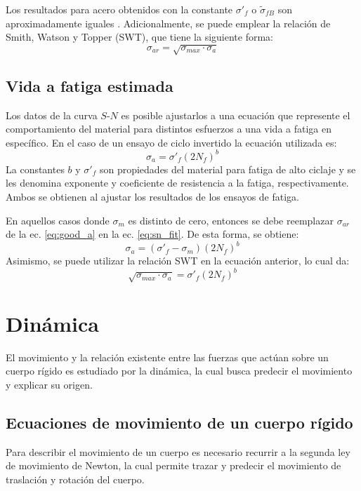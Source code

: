 Los resultados para acero obtenidos con la constante $\sigma'_f$ o $\tilde{\sigma}_{fB}$ son aproximadamente iguales \cite{dowling2013mechanical}. Adicionalmente, se puede emplear la relación de Smith, Watson y Topper (SWT), que tiene la siguiente forma:
\begin{equation} \label{eq:swt}
	\sigma_{ar} = \sqrt{\sigma_{max} \cdot \sigma_a}
\end{equation}

\subsection{Vida a fatiga estimada}
Los datos de la curva $S$-$N$ es posible ajustarlos a una ecuación que represente el comportamiento del material para distintos esfuerzos a una vida a fatiga en específico. En el caso de un ensayo de ciclo invertido la ecuación utilizada es:
\begin{equation} \label{eq:sn_fit}
	\sigma_a = \sigma'_f (2N_f)^b
\end{equation}
La constantes $b$ y $\sigma'_f$ son propiedades del material para fatiga de alto ciclaje y se les denomina exponente y coeficiente de resistencia a la fatiga, respectivamente. Ambos se obtienen al ajustar los resultados de los ensayos de fatiga. 

En aquellos casos donde $\sigma_m$ es distinto de cero, entonces se debe reemplazar $\sigma_{ar}$ de la ec. \ref{eq:good_a} en la ec. \ref{eq:sn_fit}. De esta forma, se obtiene:
\begin{equation}
	\sigma_a = (\sigma'_f - \sigma_m)(2N_f)^b
\end{equation}
Asimismo, se puede utilizar la relación SWT en la ecuación anterior, lo cual da:
\begin{equation} \label{eq:sn_swt}
	\sqrt{\sigma_{max} \cdot \sigma_a} = \sigma'_f (2N_f)^b
\end{equation}


\section{Dinámica}

El movimiento y la relación existente entre las fuerzas que actúan sobre un cuerpo rígido es estudiado por la dinámica, la cual busca predecir el movimiento y explicar su origen. 

\subsection{Ecuaciones de movimiento de un cuerpo rígido}
\label{sec:ec_mov}
Para describir el movimiento de un cuerpo es necesario recurrir a la segunda ley de movimiento de Newton, la cual permite trazar y predecir el movimiento de traslación y rotación del cuerpo.

